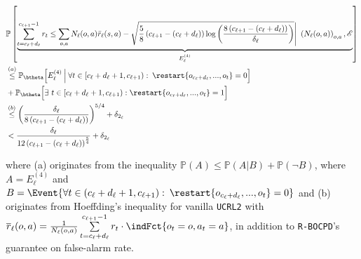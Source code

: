 \documentclass{article} %
\begin{document}
\begin{align*}
& \mathbb{P}\left[\underbrace{\sum_{t=c_\ell+d_{\ell}}^{c_{\ell+1}-1}r_t  
\leq \sum_{o,a} N_{\ell}(o,a)\Bar{r}_{\ell}(s,a)-\sqrt{\frac{5}{8}\left(c_{\ell+1}-\left( c_{\ell}+d_{\ell} \right) \right)\log\left(\frac{8\left(c_{\ell+1}-\left( c_{\ell}+d_{\ell} \right) \right)}{\delta_{\ell}}\right)} \Bigg|\ \left(N_\ell(o,a) \right)_{o,a}, \mathcal{E}}_{E^{(4)}_{\ell}}\right] \\
& \overset{(a)}{\leq} \mathbb{P}_{\btheta}\Bigl[ E^{(4)}_{\ell}\:\Big|\: \forall t \in  \left[c_\ell+d_{\ell}+1, c_{\ell+1}\right):
 \:\restart{o_{c_\ell+d_{\ell}},...,o_t}=0\Bigr] \\
 & \hspace{0cm} + \mathbb{P}_{\btheta}\Bigl[ \exists\  t \in \left[c_\ell+d_{\ell}+1, c_{\ell+1}\right):
 \restart{o_{c_\ell+d_{\ell}},...,o_t} = 1\Bigl]\\
 & \overset{(b)} \leq \left(\frac{\delta_\ell}{8\left(c_{\ell+1}-\left( c_{\ell}+d_{\ell} \right)\right)}\right)^{5/4} + \delta_{2_\ell} \\ 
 & < \frac{\delta_\ell}{12\left(c_{\ell+1}-\left( c_{\ell}+d_{\ell} \right)\right)^\frac{5}{4}} + \delta_{2_\ell}
\end{align*}

where (a) originates from the inequality $\mathbb{P}(A) \leq \mathbb{P}(A|B) + \mathbb{P}(\neg B)$, where $A  =  E^{(4)}_{\ell}$ and $B = \Event{ \forall t \in  \left(c_\ell+d_{\ell}+1, c_{\ell+1}\right): \:\restart{o_{c_\ell+d_{\ell}},...,o_t}=0}$ and (b) originates from Hoeffding's inequality for vanilla \texttt{UCRL2} with $\overline{r}_{\ell}(o,a) = \frac{1}{N_{\ell}(o,a)}\sum\limits_{t= c_{\ell}+d_{\ell}}^{c_{\ell+1}-1} r_t \cdot \indFct{o_t=o,a_t=a}$, in addition to \texttt{R-BOCPD}'s guarantee on false-alarm rate. \\ 
\end{document}
